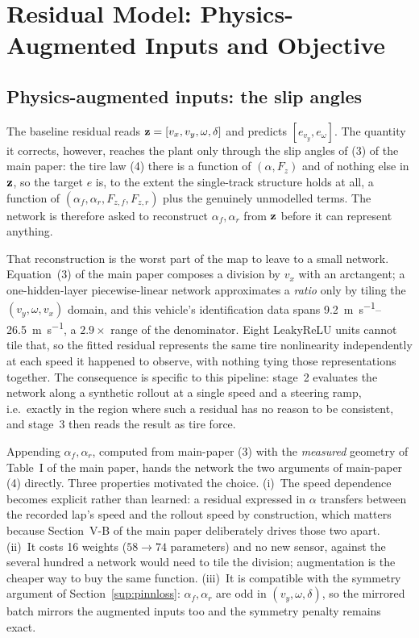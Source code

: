 
\section{Residual Model: Physics-Augmented Inputs and Objective}
\label{sup:residual}

\subsection{Physics-augmented inputs: the slip angles}
\label{sup:physinputs}
The baseline residual reads $\mathbf{z}=[v_{x},v_{y},\omega,\delta]$ and predicts
$[e_{v_{y}},e_{\omega}]$. The quantity it corrects, however, reaches the plant
only through the slip angles of (3) of the main paper: the tire law (4)
there is
a function of $(\alpha,F_{z})$ and of nothing else in $\mathbf{z}$, so the target
$e$ is, to the extent the single-track structure holds at all, a function of
$(\alpha_{f},\alpha_{r},F_{z,f},F_{z,r})$ plus the genuinely unmodelled terms.
The network is therefore asked to reconstruct
$\alpha_{f},\alpha_{r}$ from $\mathbf{z}$ before it can represent anything.

That reconstruction is the worst part of the map to leave to a small network.
Equation~(3) of the main paper composes a division by $v_{x}$ with an
arctangent; a
one-hidden-layer piecewise-linear network approximates a \emph{ratio} only by
tiling the $(v_{y},\omega,v_{x})$ domain, and this vehicle's identification
data spans \SIrange{9.2}{26.5}{\meter\per\second}, a $2.9\times$ range of the
denominator. Eight LeakyReLU units cannot tile that, so the fitted residual
represents the same tire nonlinearity independently at each speed it happened
to observe, with nothing tying those representations together. The consequence
is specific to this pipeline: stage~2 evaluates the network along a synthetic
rollout at a single speed and a steering ramp, i.e.\ exactly in the region
where such a residual has no reason to be consistent, and stage~3 then reads
the result as tire force.

Appending $\alpha_{f},\alpha_{r}$, computed from main-paper (3) with the
\emph{measured} geometry of Table~I of the main paper, hands the network the two
arguments of main-paper (4) directly. Three properties motivated the choice.
(i)~The speed dependence becomes explicit rather than learned: a residual
expressed in $\alpha$ transfers between the recorded lap's speed and the
rollout speed by construction, which matters because
Section~V-B of the main paper deliberately drives those two apart.
(ii)~It costs 16 weights ($58\rightarrow74$ parameters) and no new sensor,
against the several hundred a network would need to tile the division;
augmentation is the cheaper way to buy the same function.
(iii)~It is compatible with the symmetry argument of
Section~\ref{sup:pinnloss}: $\alpha_{f},\alpha_{r}$ are odd in
$(v_{y},\omega,\delta)$, so the mirrored batch mirrors the augmented inputs too
and the symmetry penalty remains exact.

